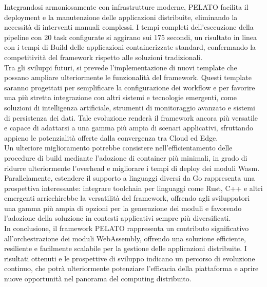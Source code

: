 Integrandosi armoniosamente con infrastrutture moderne, PELATO facilita il deployment e la manutenzione delle applicazioni distribuite, eliminando la necessità di interventi manuali complessi. I tempi completi dell’esecuzione della pipeline con 20 task configurate si aggirano sui 175 secondi, un risultato in linea con i tempi di Build delle applicazioni containerizzate standard, confermando la competitività del framework rispetto alle soluzioni tradizionali.\\
Tra gli sviluppi futuri, si prevede l’implementazione di nuovi template che possano ampliare ulteriormente le funzionalità del framework. Questi template saranno progettati per semplificare la configurazione dei workflow e per favorire una più stretta integrazione con altri sistemi e tecnologie emergenti, come soluzioni di intelligenza artificiale, strumenti di monitoraggio avanzato e sistemi di persistenza dei dati. Tale evoluzione renderà il framework ancora più versatile e capace di adattarsi a una gamma più ampia di scenari applicativi, sfruttando appieno le potenzialità offerte dalla convergenza tra Cloud ed Edge.\\
Un ulteriore miglioramento potrebbe consistere nell’efficientamento delle procedure di build mediante l’adozione di container più minimali, in grado di ridurre ulteriormente l’overhead e migliorare i tempi di deploy dei moduli Wasm. Parallelamente, estendere il supporto a linguaggi diversi da Go rappresenta una prospettiva interessante: integrare toolchain per linguaggi come Rust, C++ e altri emergenti arricchirebbe la versatilità del framework, offrendo agli sviluppatori una gamma più ampia di opzioni per la generazione dei moduli e favorendo l’adozione della soluzione in contesti applicativi sempre più diversificati.\\
In conclusione, il framework PELATO rappresenta un contributo significativo all’orchestrazione dei moduli WebAssembly, offrendo una soluzione efficiente, resiliente e facilmente scalabile per la gestione delle applicazioni distribuite. I risultati ottenuti e le prospettive di sviluppo indicano un percorso di evoluzione continuo, che potrà ulteriormente potenziare l’efficacia della piattaforma e aprire nuove opportunità nel panorama del computing distribuito.